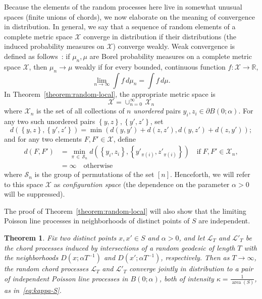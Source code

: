 \documentclass[10pt]{amsart}
\newtheorem{theo}{Theorem}[section]
\theoremstyle{definition}\newtheorem{defi}[theo]{Definition}\newtheorem{rema}[theo]{Remark}\newtheorem{exam}[theo]{Example}\newtheorem{exem}[theo]{Example}\newtheorem{nota}[theo]{Notation}
\newcommand{\xset}[1]{\left\{ #1 \right\}}
\newcommand{\zz}[1]{\mathbb #1}
\DeclareMathOperator{\area}{area}
\begin{document}
Because the elements of the random processes here live in somewhat unusual spaces (finite unions of chords), we now elaborate on the meaning of convergence in distribution. In general, we say that a sequence of random elements of a complete metric space $\mathcal{X}$ converge in distribution if their distributions (the induced probability measures on $\mathcal{X}$) converge weakly. Weak convergence is defined as follows~\cite{billingsley}: if $\mu_{n},\mu$ are Borel probability measures on a complete metric space $\mathcal{X}$, then $\mu_{n}\rightarrow \mu$ weakly if for every bounded, continuous function $f:\mathcal{X}\rightarrow \zz{R}$,
\begin{equation}\label{eq:weak-conv-definition}
\lim_{n \rightarrow\infty}\int f\, d\mu_{n} =\int f \,d\mu.
\end{equation}
In Theorem~\ref{theorem:random-local}, the appropriate metric space is
\[
\mathcal{X}=\cup_{n=0}^{\infty}\,\mathcal{X}_{n}
\]
where $\mathcal{X}_{n}$ is the set of all collections of $n$ \emph{unordered} pairs $y_{i}, z_{i}\in \partial B (0;\alpha)$. For any two such unordered pairs $\xset {y,z}, \xset {y',z'}$, set
\[
d\left(\xset {y,z}, \xset {y',z'}\right)=\min (d(y,y')+d(z,z'),d(y,z')+d(z,y'));
\]
and for any two elements $F,F'\in \mathcal{X}$, define
\begin{align*}
d(F,F')&= \min _{\pi\,\in\,\mathcal{S}_{n}} d\left (\xset {y_{i},z_{i}},\xset {y'_{ \pi (i)},z'_{\pi (i)}}\right) \quad
\text{if} \; F,F' \in \mathcal{X}_{n}, \\
&= \infty \quad \text{otherwise}
\end{align*}
where $\mathcal{S}_{n}$ is the group of permutations of the set $[n]$. Henceforth, we will refer to this space $\mathcal{X}$ as \emph{configuration space} (the dependence on the parameter $\alpha >0$ will be suppressed).

The proof of Theorem~\ref{theorem:random-local} will also show that the limiting Poisson line processes in neighborhoods of distinct points of $S$ are independent.

\begin{theo}\label{theorem:random-local-pairs}
Fix two distinct points $x,x'\in S$ and $\alpha >0$, and let $\mathcal{L}_{T}$ and $\mathcal{L}'_{T}$ be the chord processes induced by intersections of a random geodesic of length $T$ with the neighborhoods $D(x;\alpha T^{-1})$ and $D(x';\alpha T^{-1})$, respectively. Then as $T \rightarrow \infty$, the random chord processes $\mathcal{L}_{T}$ and $\mathcal{L}'_{T}$ converge jointly in distribution to a pair of independent Poisson line processes in $B (0;\alpha)$, both of intensity $\kappa = \frac{1}{\area(S)}$, as in~\eqref{eq:kappa-S}.
\end{theo}
\end{document}
